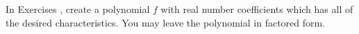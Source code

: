 {\noindent In Exercises}
{, create a polynomial $f$ with real number coefficients which has all of the desired characteristics.  You may leave the polynomial in factored form. }
